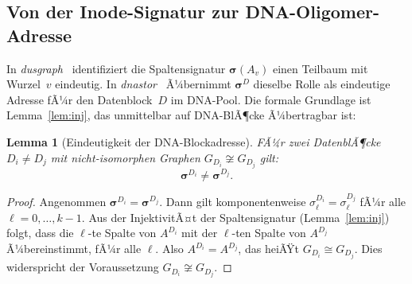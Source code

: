 ﻿\documentclass[a4paper,12pt]{article}
\theoremstyle{definition}
\theoremstyle{plain}
\newtheorem{lemma}{Lemma}[section]
\begin{document}
\subsection{Von der Inode-Signatur zur DNA-Oligomer-Adresse}

In \textit{dusgraph}~\cite{dusgraph} identifiziert die Spaltensignatur
$\boldsymbol{\sigma}(A_v)$ einen Teilbaum mit Wurzel~$v$ eindeutig.
In \textit{dnastor}~\cite{dnastor} Ã¼bernimmt
$\boldsymbol{\sigma}^D$ dieselbe Rolle als eindeutige Adresse fÃ¼r den
Datenblock~$D$ im DNA-Pool.  Die formale Grundlage ist Lemma~\ref{lem:inj},
das unmittelbar auf DNA-BlÃ¶cke Ã¼bertragbar ist:

\begin{lemma}[Eindeutigkeit der DNA-Blockadresse]
\label{lem:dna_eindeutig}
  FÃ¼r zwei DatenblÃ¶cke $D_i \neq D_j$ mit nicht-isomorphen Graphen
  $G_{D_i} \not\cong G_{D_j}$ gilt:
  \[
    \boldsymbol{\sigma}^{D_i} \neq \boldsymbol{\sigma}^{D_j}.
  \]
\end{lemma}

\begin{proof}
  Angenommen $\boldsymbol{\sigma}^{D_i} = \boldsymbol{\sigma}^{D_j}$.
  Dann gilt komponentenweise $\sigma_\ell^{D_i} = \sigma_\ell^{D_j}$
  fÃ¼r alle $\ell = 0, \ldots, k-1$.
  Aus der InjektivitÃ¤t der Spaltensignatur (Lemma~\ref{lem:inj}) folgt,
  dass die $\ell$-te Spalte von $A^{D_i}$ mit der $\ell$-ten Spalte von
  $A^{D_j}$ Ã¼bereinstimmt, fÃ¼r alle $\ell$.
  Also $A^{D_i} = A^{D_j}$, das heiÃŸt $G_{D_i} \cong G_{D_j}$.
  Dies widerspricht der Voraussetzung $G_{D_i} \not\cong G_{D_j}$. 
\end{proof}
\end{document}
